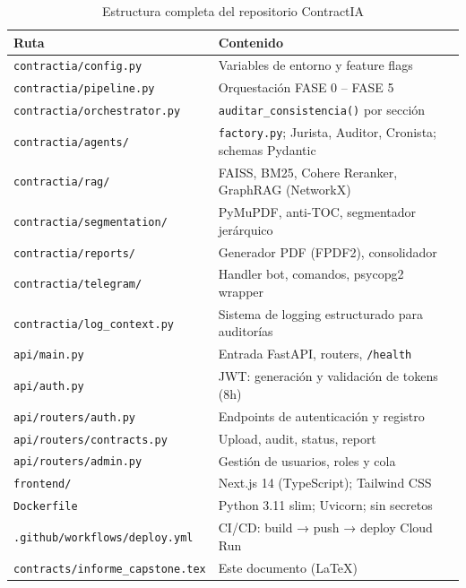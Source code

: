 \begin{table}[H]
\centering
\caption{Estructura completa del repositorio ContractIA}
\label{tab:repo_completo}
\begin{tabular}{p{5cm} p{8cm}}
\toprule
\textbf{Ruta} & \textbf{Contenido} \\
\midrule
\texttt{contractia/config.py}       & Variables de entorno y feature flags \\
\texttt{contractia/pipeline.py}     & Orquestación FASE 0 -- FASE 5 \\
\texttt{contractia/orchestrator.py} & \texttt{auditar\_consistencia()} por sección \\
\texttt{contractia/agents/}         & \texttt{factory.py}; Jurista, Auditor, Cronista; schemas Pydantic \\
\texttt{contractia/rag/}            & FAISS, BM25, Cohere Reranker, GraphRAG (NetworkX) \\
\texttt{contractia/segmentation/}   & PyMuPDF, anti-TOC, segmentador jerárquico \\
\texttt{contractia/reports/}        & Generador PDF (FPDF2), consolidador \\
\texttt{contractia/telegram/}       & Handler bot, comandos, psycopg2 wrapper \\
\texttt{contractia/log\_context.py} & Sistema de logging estructurado para auditorías \\
\texttt{api/main.py}                & Entrada FastAPI, routers, \texttt{/health} \\
\texttt{api/auth.py}                & JWT: generación y validación de tokens (8h) \\
\texttt{api/routers/auth.py}        & Endpoints de autenticación y registro \\
\texttt{api/routers/contracts.py}   & Upload, audit, status, report \\
\texttt{api/routers/admin.py}       & Gestión de usuarios, roles y cola \\
\texttt{frontend/}                  & Next.js 14 (TypeScript); Tailwind CSS \\
\texttt{Dockerfile}                 & Python 3.11 slim; Uvicorn; sin secretos \\
\texttt{.github/workflows/deploy.yml} & CI/CD: build → push → deploy Cloud Run \\
\texttt{contracts/informe\_capstone.tex} & Este documento (LaTeX) \\
\bottomrule
\end{tabular}
\end{table}

